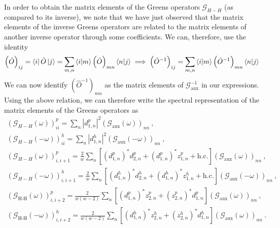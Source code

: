 \documentclass[10pt]{report}
\numberwithin{equation}{section}
\begin{document}
In order to obtain the matrix elements of the Greens operators \(\mathcal{G}_{H-H}\) (as compared to its inverse), we note that we have just observed that the matrix elements of the inverse Greens operators are related to the matrix elements of another inverse operator through some coefficients. We can, therefore, use the identity
\begin{equation}\begin{aligned}
\left(\hat O\right)_{ij} = \bra{i} \hat O \ket{j} = \sum_{m,n} \braket{i|m} \left(\hat O\right)_{mn} \braket{n|j} \implies \left(\hat O^{-1}\right)_{ij} = \sum_{m,n} \braket{i|m} \left(\hat O^{-1}\right)_{mn} \braket{n|j}
\end{aligned}\end{equation}
We can now identify \(\left(\hat O^{-1}\right)_{mn}\) as the matrix elements of \(\mathcal{G}_\text{aux}^{-1}\) in our expressions. Using the above relation, we can therefore write the spectral representation of the matrix elements of the Greens operators as 
\begin{gather}
	\left(\mathcal{G}_{H-H}(\omega)\right)^p_{ii} = \sum_{n} |d^p_{1,n}|^2 \left(\mathcal{G}_\text{aux}(\omega)\right)_{nn}~,\\
	\left(\mathcal{G}_{H-H}(-\omega)\right)^h_{ii} = \sum_{n} |d^h_{1,n}|^2 \left(\mathcal{G}_\text{aux}(-\omega)\right)_{nn}~,\\
	\left(\mathcal{G}_{H-H}\left(\omega\right) \right)^p_{i,i+1} = \frac{2}{w}\sum_n \left[\left(d^p_{1,n}\right)^*d^p_{2,n} + \left(d^p_{1,n}\right)^* z^p_{1,n} + \text{h.c.}\right] \left(\mathcal{G}_\text{aux}(\omega) \right)_{nn}~,\\
	\left(\mathcal{G}_{H-H}\left(-\omega\right) \right)^h_{i,i+1} = \frac{2}{w}\sum_n \left[\left(d^h_{1,n}\right)^*d^h_{2,n} + \left(d^h_{1,n}\right)^* z^h_{1,n} + \text{h.c.}\right] \left(\mathcal{G}_\text{aux}(-\omega) \right)_{nn}~,\\
	\left(\mathcal{G}_\text{H-H}\left( \omega \right) \right)^p_{i,i+2} = \frac{2}{w(w-2)}\sum_n \left[\left(d^p_{1,n}\right)^* z^p_{2,n} + \left(z^p_{2,n}\right)^* d^p_{1,n}\right] \left(\mathcal{G}_\text{aux}(\omega)\right)_{nn}~,\\
	\left(\mathcal{G}_\text{H-H}\left( -\omega \right) \right)^h_{i,i+2} = \frac{2}{w(w-2)}\sum_n \left[\left(d^h_{1,n}\right)^* z^h_{2,n} + \left(z^h_{2,n}\right)^* d^h_{1,n}\right] \left(\mathcal{G}_\text{aux}(\omega)\right)_{nn}~.
\end{gather}
\end{document}
